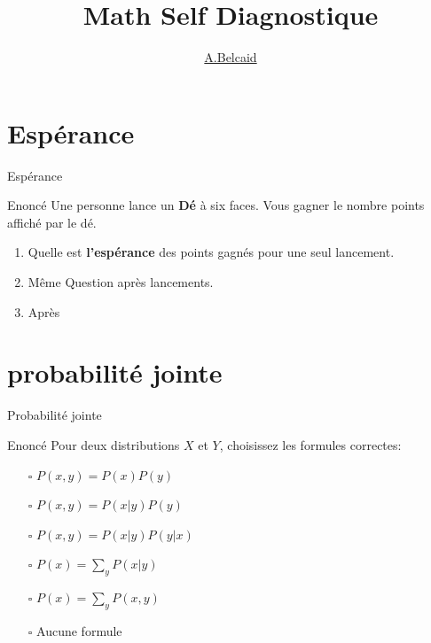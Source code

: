 \documentclass{beamer}
\title{Math Self Diagnostique}
\author{\underline{A.Belcaid}}
\institute{\small ENSA-Fès}
\begin{document}
\maketitle

\begin{frame}
\tableofcontents
\end{frame}


\section{Espérance}%
\label{sec:esperance}

\begin{frame}[<+->]{Espérance}
  
  \begin{block}{Enoncé}
  Une personne lance un \alert{ \textbf{Dé} } à six faces. Vous gagner le
  nombre points affiché par le dé.
\end{block}

\vspace*{1cm}

  \begin{enumerate}
    \item Quelle est \textbf{l'espérance} des points gagnés pour une seul lancement. 
    \item Même Question après  lancements.
    \item Après 
  \end{enumerate}
\end{frame}



\section{probabilité jointe}%
\label{sec:probabilite_jointe}

\begin{frame}[t]{Probabilité jointe}
  
  \begin{block}{Enoncé}
   Pour deux distributions $X$ et $Y$, choisissez les formules correctes:
  \end{block}
  \pause
\begin{block}{}
  \begin{itemize}
    \item[$\square$] $P(x,y) = P(x)P(y)$
    \item[$\square$] $P(x,y) = P(x|y)P(y)$
    \item[$\square$] $P(x,y) = P(x|y)P(y|x)$
    \item[$\square$] $P(x) =\sum_y P(x|y)$
    \item[$\square$]  $ P(x) = \sum_y P(x,y)$
    \item[$\square$] Aucune formule
  \end{itemize} 
\end{block}
\end{frame}
\end{document}
